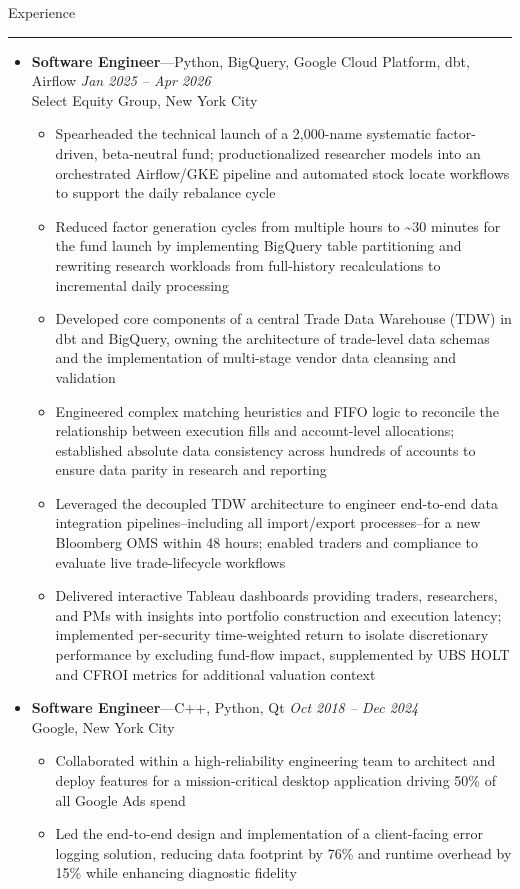 \documentclass[10pt,oneside]{article}
\newcommand{\sectitle}[1]{
  \begin{flushleft}{\selectfont\Large#1}\end{flushleft}
}
\newenvironment{ressection}[1]{
  \vspace{0pt}
  \sectitle{#1}
  \vspace{-10pt}\rule{\textwidth}{0.5pt}
  \vspace{-10pt}
  \begin{itemize}[leftmargin=0pt, rightmargin=-5pt, label={}]
  \vspace{-2pt}
  }{
  \end{itemize}
}
\newcommand{\ressubitem}[1]{
  \vspace{-1pt}
  \item[$\bullet$] \begin{flushleft} #1 \end{flushleft}
}
\newcommand{\resbigitemline}[4]{
  \vspace{-1pt}
  \item
  \textbf{#1}---#4
  \hfill
  \textit{#3} \\
  #2

}
\newenvironment{ressubsecline}[4]{
  \resbigitemline{#1}{#2}{#3}{#4}
  \vspace{-2pt}
  \begin{itemize}[rightmargin=5pt]
}{
  \end{itemize}
  \vspace{-2pt}
}
\begin{document}
\begin{ressection}{Experience}
	\begin{ressubsecline}{Software Engineer}{Select Equity Group, New York City}{Jan 2025 -- Apr 2026}{Python, BigQuery, Google Cloud Platform, dbt, Airflow}
	    \ressubitem{Spearheaded the technical launch of a 2,000-name systematic factor-driven, beta-neutral fund; productionalized researcher models into an orchestrated Airflow/GKE pipeline and automated stock locate workflows to support the daily rebalance cycle}
	    \ressubitem{Reduced factor generation cycles from multiple hours to \textasciitilde30 minutes for the fund launch by implementing BigQuery table partitioning and rewriting research workloads from full-history recalculations to incremental daily processing}
	    \ressubitem{Developed core components of a central Trade Data Warehouse (TDW) in dbt and BigQuery, owning the architecture of trade-level data schemas and the implementation of multi-stage vendor data cleansing and validation}
	    \ressubitem{Engineered complex matching heuristics and FIFO logic to reconcile the relationship between execution fills and account-level allocations; established absolute data consistency across hundreds of accounts to ensure data parity in research and reporting}
	    \ressubitem{Leveraged the decoupled TDW architecture to engineer end-to-end data integration pipelines--including all import/export processes--for a new Bloomberg OMS within 48 hours; enabled traders and compliance to evaluate live trade-lifecycle workflows}
	    \ressubitem{Delivered interactive Tableau dashboards providing traders, researchers, and PMs with insights into portfolio construction and execution latency; implemented per-security time-weighted return to isolate discretionary performance by excluding fund-flow impact, supplemented by UBS HOLT and CFROI metrics for additional valuation context}
	\end{ressubsecline}
  \begin{ressubsecline}{Software Engineer}{Google, New York City}{Oct 2018 -- Dec 2024}{C++, Python, Qt}
    \ressubitem{Collaborated within a high-reliability engineering team to architect and deploy features for a mission-critical desktop application driving 50\% of all Google Ads spend}
    \ressubitem{Led the end-to-end design and implementation of a client-facing error logging solution, reducing data footprint by 76\% and runtime overhead by 15\% while enhancing diagnostic fidelity}

\end{ressubsecline}
\end{ressection}
\end{document}
